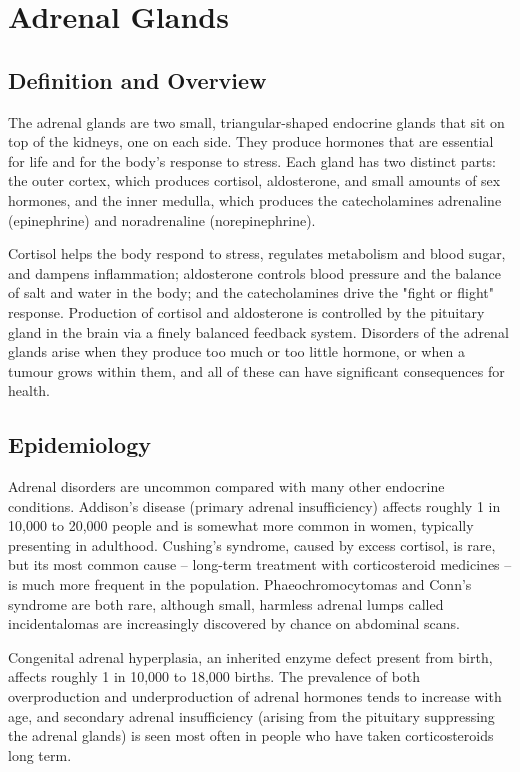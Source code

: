 \chapter{Adrenal Glands}

\section*{Definition and Overview}
The adrenal glands are two small, triangular-shaped endocrine glands that sit on top of the kidneys, one on each side. They produce hormones that are essential for life and for the body's response to stress. Each gland has two distinct parts: the outer cortex, which produces cortisol, aldosterone, and small amounts of sex hormones, and the inner medulla, which produces the catecholamines adrenaline (epinephrine) and noradrenaline (norepinephrine).

Cortisol helps the body respond to stress, regulates metabolism and blood sugar, and dampens inflammation; aldosterone controls blood pressure and the balance of salt and water in the body; and the catecholamines drive the "fight or flight" response. Production of cortisol and aldosterone is controlled by the pituitary gland in the brain via a finely balanced feedback system. Disorders of the adrenal glands arise when they produce too much or too little hormone, or when a tumour grows within them, and all of these can have significant consequences for health.

\section*{Epidemiology}
Adrenal disorders are uncommon compared with many other endocrine conditions. Addison's disease (primary adrenal insufficiency) affects roughly 1 in 10,000 to 20,000 people and is somewhat more common in women, typically presenting in adulthood. Cushing's syndrome, caused by excess cortisol, is rare, but its most common cause -- long-term treatment with corticosteroid medicines -- is much more frequent in the population. Phaeochromocytomas and Conn's syndrome are both rare, although small, harmless adrenal lumps called incidentalomas are increasingly discovered by chance on abdominal scans.

Congenital adrenal hyperplasia, an inherited enzyme defect present from birth, affects roughly 1 in 10,000 to 18,000 births. The prevalence of both overproduction and underproduction of adrenal hormones tends to increase with age, and secondary adrenal insufficiency (arising from the pituitary suppressing the adrenal glands) is seen most often in people who have taken corticosteroids long term.

